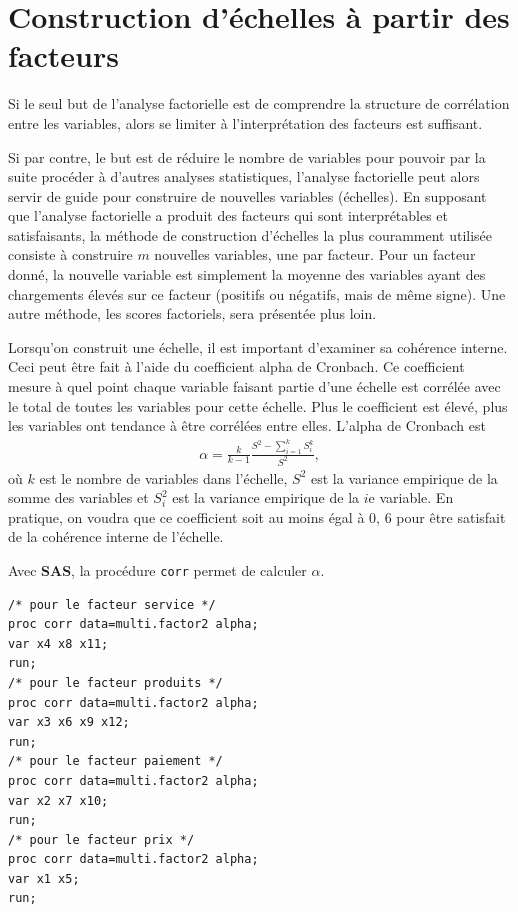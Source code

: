 \documentclass[
]{book}
\theoremstyle{definition}
\theoremstyle{definition}
\theoremstyle{definition}
\theoremstyle{remark}
\begin{document}
\hypertarget{construction-duxe9chelles-uxe0-partir-des-facteurs}{%
\section{Construction d'échelles à partir des facteurs}\label{construction-duxe9chelles-uxe0-partir-des-facteurs}}

Si le seul but de l'analyse factorielle est de comprendre la structure de corrélation entre les variables, alors se limiter à l'interprétation des facteurs est suffisant.

Si par contre, le but est de réduire le nombre de variables pour pouvoir par la suite procéder à d'autres analyses statistiques, l'analyse factorielle peut alors servir de guide pour construire de nouvelles variables (échelles). En supposant que l'analyse factorielle a produit des facteurs qui sont interprétables et satisfaisants, la méthode de construction d'échelles la plus couramment utilisée consiste à construire \(m\) nouvelles variables, une par facteur. Pour un facteur donné, la nouvelle variable est simplement la moyenne des variables ayant des chargements élevés sur ce facteur (positifs ou négatifs, mais de même signe). Une autre méthode, les scores factoriels, sera présentée plus loin.

Lorsqu'on construit une échelle, il est important d'examiner sa cohérence interne. Ceci peut être fait à l'aide du coefficient alpha de Cronbach. Ce coefficient mesure à quel point chaque variable faisant partie d'une échelle est corrélée avec le total de toutes les variables pour cette échelle.
Plus le coefficient est élevé, plus les variables ont tendance à être corrélées entre elles. L'alpha de Cronbach est
\begin{align*}
\alpha=\frac{k}{k-1} \frac{S^2-\sum_{i=1}^k S_i^k}{S^2}, 
\end{align*}
où \(k\) est le nombre de variables dans l'échelle, \(S^2\) est la variance empirique de la somme des variables et \(S_i^2\) est la variance empirique de la \(i\)e variable. En pratique, on voudra que ce coefficient soit au moins égal à 0, 6 pour être satisfait de la cohérence interne de l'échelle.

Avec \textbf{SAS}, la procédure \texttt{corr} permet de calculer \(\alpha\).

\begin{verbatim}
/* pour le facteur service */
proc corr data=multi.factor2 alpha;
var x4 x8 x11;
run;
/* pour le facteur produits */
proc corr data=multi.factor2 alpha;
var x3 x6 x9 x12;
run;
/* pour le facteur paiement */
proc corr data=multi.factor2 alpha;
var x2 x7 x10;
run;
/* pour le facteur prix */
proc corr data=multi.factor2 alpha;
var x1 x5;
run;
\end{verbatim}
\end{document}
